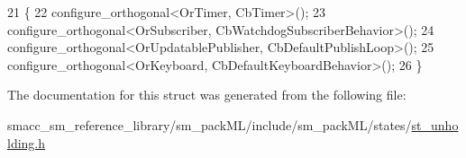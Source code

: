 \begin{DoxyCode}
21     \{
22         configure\_orthogonal<OrTimer, CbTimer>();   
23         configure\_orthogonal<OrSubscriber, CbWatchdogSubscriberBehavior>();
24         configure\_orthogonal<OrUpdatablePublisher, CbDefaultPublishLoop>();
25         configure\_orthogonal<OrKeyboard, CbDefaultKeyboardBehavior>();
26     \}
\end{DoxyCode}


The documentation for this struct was generated from the following file\+:\begin{DoxyCompactItemize}
\item 
smacc\+\_\+sm\+\_\+reference\+\_\+library/sm\+\_\+pack\+M\+L/include/sm\+\_\+pack\+M\+L/states/\hyperlink{st__unholding_8h}{st\+\_\+unholding.\+h}\end{DoxyCompactItemize}
